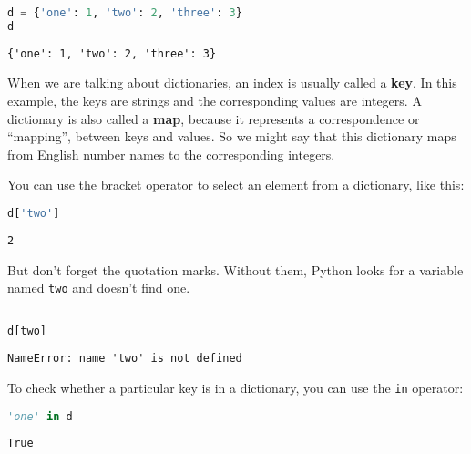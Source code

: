 \begin{lstlisting}[language=Python,style=source]
d = {'one': 1, 'two': 2, 'three': 3}
d
\end{lstlisting}

\begin{lstlisting}[style=output]
{'one': 1, 'two': 2, 'three': 3}
\end{lstlisting}

When we are talking about dictionaries, an index is usually called a
\textbf{key}. In this example, the keys are strings and the
corresponding values are integers. A dictionary is also called a
\textbf{map}, because it represents a correspondence or ``mapping'',
between keys and values. So we might say that this dictionary maps from
English number names to the corresponding integers.

\pagebreak

You can use the bracket operator to select an element from a dictionary,
like this:

\begin{lstlisting}[language=Python,style=source]
d['two']
\end{lstlisting}

\begin{lstlisting}[style=output]
2
\end{lstlisting}

But don't forget the quotation marks. Without them, Python looks for a
variable named \passthrough{\lstinline!two!} and doesn't find one.

\begin{lstlisting}[language=Python,style=source]
%%expect NameError

d[two]
\end{lstlisting}

\begin{lstlisting}[style=output]
NameError: name 'two' is not defined
\end{lstlisting}

To check whether a particular key is in a dictionary, you can use the
\passthrough{\lstinline!in!} operator:

\begin{lstlisting}[language=Python,style=source]
'one' in d
\end{lstlisting}

\begin{lstlisting}[style=output]
True
\end{lstlisting}

